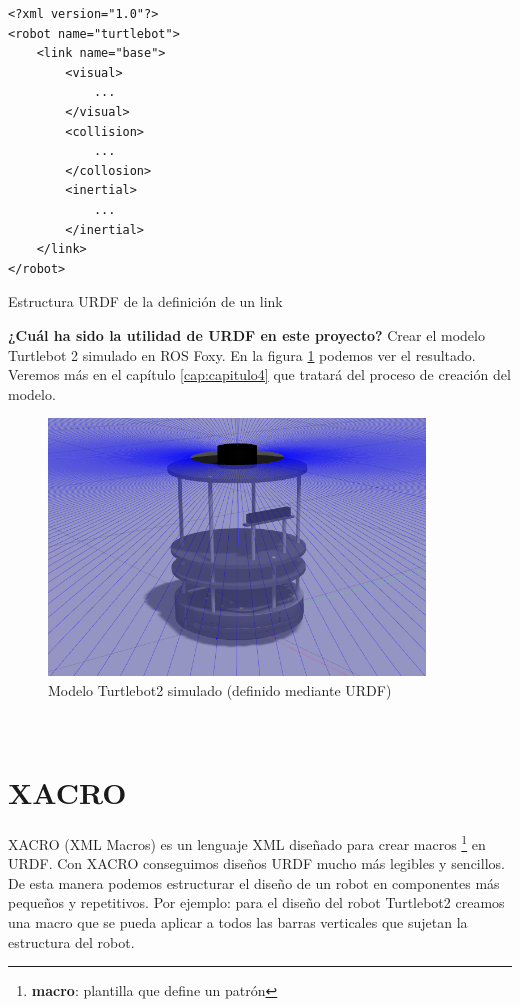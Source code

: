 \begin{code}[H]
\begin{lstlisting}
<?xml version="1.0"?>
<robot name="turtlebot">
	<link name="base">
		<visual>
			...
		</visual>
		<collision>
			...
		</collosion>
		<inertial>
			...
		</inertial>
	</link>
</robot>
\end{lstlisting}
\caption[Estructura URDF de la definicion de un link]{Estructura URDF de la definición de un link}
\label{cod:estructura_urdf}
\end{code}

\textbf{¿Cuál ha sido la utilidad de URDF en este proyecto?} Crear el modelo Turtlebot 2 simulado en ROS Foxy. En la figura \ref{fig:modelo_turtlebot2_simulado} podemos ver el resultado. Veremos más en el capítulo \ref{cap:capitulo4} que tratará del proceso de creación del modelo.
\begin{figure} [H]
  \begin{center}
    \includegraphics[width=10cm]{imagenes/turtlebot2-sim.png}
  \end{center}
  \caption{Modelo Turtlebot2 simulado (definido mediante URDF)}
  \label{fig:modelo_turtlebot2_simulado}
\end{figure}\




\section{XACRO}
\label{sec:xacro}

XACRO (XML Macros) es un lenguaje XML diseñado para crear macros \footnote{\textbf{macro}: plantilla que define un patrón} en URDF. Con XACRO conseguimos diseños URDF mucho más legibles y sencillos. De esta manera podemos estructurar el diseño de un robot en componentes más pequeños y repetitivos. Por ejemplo: para el diseño del robot Turtlebot2 creamos una macro que se pueda aplicar a todos las barras verticales que sujetan la estructura del robot.\\

